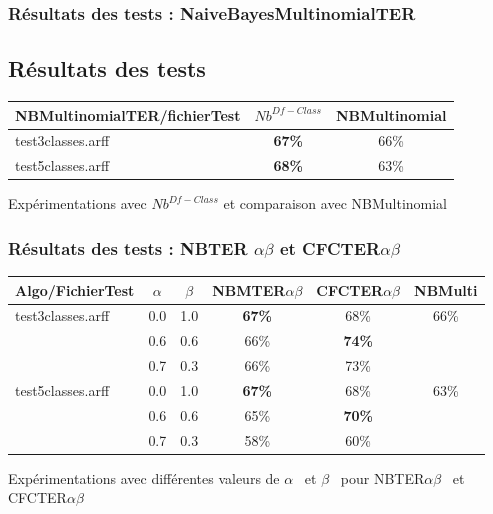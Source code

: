 \documentclass[12pt]{beamer}
\begin{document}
\begin{frame}
\frametitle{Résultats des tests : NaiveBayesMultinomialTER}
\subsection{Résultats des tests}

\begin{table}
\centering
    \begin{tabular}{|l|c||c|}
    \hline
    NBMultinomialTER/fichierTest  & $Nb^{Df-Class}$ & NBMultinomial \\ \hline
    test3classes.arff & \textbf{67\%}   & 66\%  \\ \hline
    test5classes.arff & \textbf{68\%} & 63\%  \\ \hline
    \end{tabular}
\end{table}
\medskip
Expérimentations avec $Nb^{Df-Class}$ et comparaison avec NBMultinomial
\end{frame}

\begin{frame}
\frametitle{Résultats des tests : NBTER $\alpha\beta$ et CFCTER$\alpha\beta$ }
\begin{footnotesize}



\begin{table}


    \begin{tabular}{|l|c|c|c|c||c|}
\hline
 Algo/FichierTest & $\alpha$ & $\beta$ & NBMTER$\alpha\beta$ & CFCTER$\alpha\beta$ & NBMulti \\
    \hline
    test3classes.arff &  0.0 &  1.0& \textbf{67\%} & 68\% & 66\% \\
    \cline{2-5}
         ~ &   0.6  &  0.6 & 66\% & \textbf{74\%} & ~\\
         \cline{2-5}
         ~ &   0.7  &  0.3 & 66\% & 73\% & ~\\
    \hline
     test5classes.arff &  0.0 &  1.0& \textbf{67\%} &68\% & 63\% \\
    \cline{2-5}
         ~ &   0.6  &  0.6 & 65\% & \textbf{70\%} & ~\\
         \cline{2-5}
         ~ &   0.7  &  0.3 & 58\% & 60\% & ~\\
    \hline
    \end{tabular}
\end{table}
\end{footnotesize}
\medskip
Expérimentations avec différentes valeurs de $\alpha$  \ et $\beta$ \  pour NBTER$\alpha\beta$ \ et CFCTER$\alpha\beta$ 
\end{frame}
\end{document}
